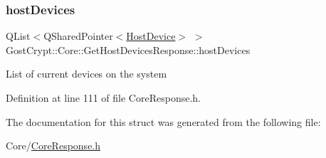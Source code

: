 \subsubsection{\texorpdfstring{host\+Devices}{hostDevices}}
{\footnotesize\ttfamily Q\+List$<$Q\+Shared\+Pointer$<$\hyperlink{struct_gost_crypt_1_1_core_1_1_host_device}{Host\+Device}$>$ $>$ Gost\+Crypt\+::\+Core\+::\+Get\+Host\+Devices\+Response\+::host\+Devices}

List of current devices on the system 

Definition at line 111 of file Core\+Response.\+h.



The documentation for this struct was generated from the following file\+:\begin{DoxyCompactItemize}
\item 
Core/\hyperlink{_core_response_8h}{Core\+Response.\+h}\end{DoxyCompactItemize}
